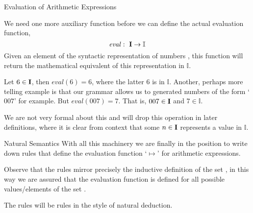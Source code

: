 \documentclass{beamer}
\begin{document}
\begin{frame}{\large Evaluation of Arithmetic Expressions}

\small
We need one more auxiliary function before we can define the actual evaluation function,
\[
\mathit{eval}\,\colon\; \mbox{\bf I} \rightarrow \mathbb{I}
\]
Given an element of the syntactic representation of numbers , this
function will return the mathematical equivalent of this representation in $\mathbb{I}$.

\vspace{.1in}

Let $6 \in \mbox{\bf I}$, then $\mathit{eval}(6) = 6$, where the latter $6$ is in $\mathbb{I}$.
Another, perhaps more telling example is that our grammar allows us to generated numbers of
the form `$007$' for example.  But $\mathit{eval}(007) = 7$.  That is, $007\in\mbox{\bf I}$ and
$7\in\mathbb{I}$.

\vspace{.1in}

We are not very formal about this and will
drop this operation in later definitions, where it is clear from context that some $n \in \mbox{\bf I}$
represents a value in $\mathbb I$.
\end{frame}


\begin{frame}{Natural Semantics}
With all this machinery we are finally in the position to write down rules that define the
evaluation function `$\mapsto$' for arithmetic expressions.

\vspace{.1in}

Observe that the rules mirror precisely the inductive definition of the set ,
in this way we are assured that the evaluation function is defined for all possible values/elements
of the set .

\vspace{.1in}

The rules will be rules in the style of natural deduction.
\end{frame}

\end{document}
